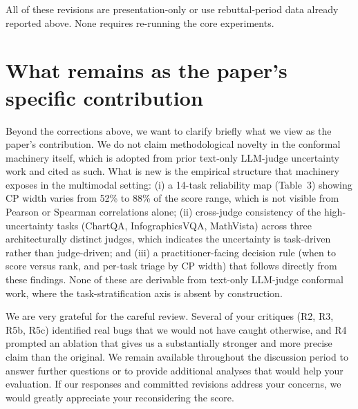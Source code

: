\documentclass[11pt]{article}
\begin{document}
All of these revisions are presentation-only or use rebuttal-period data already reported above. None requires re-running the core experiments.

\section*{What remains as the paper's specific contribution}

Beyond the corrections above, we want to clarify briefly what we view as the paper's contribution. We do not claim methodological novelty in the conformal machinery itself, which is adopted from prior text-only LLM-judge uncertainty work and cited as such. What is new is the empirical structure that machinery exposes in the multimodal setting: (i) a 14-task reliability map (Table~3) showing CP width varies from 52\% to 88\% of the score range, which is not visible from Pearson or Spearman correlations alone; (ii) cross-judge consistency of the high-uncertainty tasks (ChartQA, InfographicsVQA, MathVista) across three architecturally distinct judges, which indicates the uncertainty is task-driven rather than judge-driven; and (iii) a practitioner-facing decision rule (when to score versus rank, and per-task triage by CP width) that follows directly from these findings. None of these are derivable from text-only LLM-judge conformal work, where the task-stratification axis is absent by construction.

We are very grateful for the careful review. Several of your critiques (R2, R3, R5b, R5c) identified real bugs that we would not have caught otherwise, and R4 prompted an ablation that gives us a substantially stronger and more precise claim than the original. We remain available throughout the discussion period to answer further questions or to provide additional analyses that would help your evaluation. If our responses and committed revisions address your concerns, we would greatly appreciate your reconsidering the score.
\end{document}
